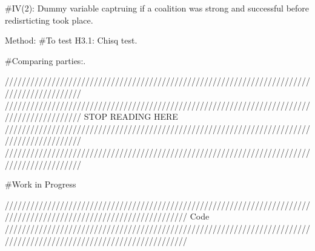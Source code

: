 \documentclass[]{article}
\begin{document}
\#IV(2): Dummy variable captruing if a coalition was strong and
successful before redisrticting took place.

Method: \#To test H3.1: Chisq test.

\#Comparing parties:.

//////////////////////////////////////////////////////////////////////////////////////////
//////////////////////////////////////////////////////////////////////////////////////////
STOP READING HERE
//////////////////////////////////////////////////////////////////////////////////////////
//////////////////////////////////////////////////////////////////////////////////////////

\#Work in Progress

///////////////////////////////////////////////////////////////////////////////////////////////////////////////////
Code
///////////////////////////////////////////////////////////////////////////////////////////////////////////////////
\end{document}
